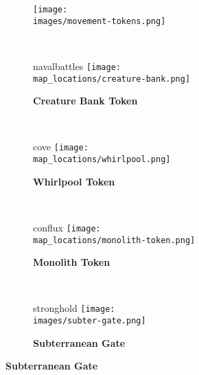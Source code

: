 \begin{figure}[H]
  \centering
  \begin{subfigure}[c]{0.15\linewidth}
    \centering
    \texttt{[image: \\images/movement-tokens.png]}
    \caption{\textbf{}}
  \end{subfigure}
  ~
  \begin{subfigure}[c]{0.15\linewidth}
    \begin{expansionmini}{navalbattles}
      \vspace{3mm}
      \centering
      \texttt{[image: \\map\_locations/creature-bank.png]}
      \caption{\textbf{Creature Bank Token}}
    \end{expansionmini}
  \end{subfigure}
  ~
  \begin{subfigure}[c]{0.12\linewidth}
    \begin{expansionmini}{cove}
      \vspace{3mm}
      \centering
      \texttt{[image: \\map\_locations/whirlpool.png]}
      \caption{\textbf{Whirlpool Token \phantom{Population}}}
    \end{expansionmini}
  \end{subfigure}
  ~
  \begin{subfigure}[c]{0.12\linewidth}
    \begin{expansionmini}{conflux}
      \vspace{3mm}
      \centering
      \texttt{[image: \\map\_locations/monolith-token.png]}
      \caption{\textbf{Monolith Token \phantom{Population}}}
    \end{expansionmini}
  \end{subfigure}
  ~
  \begin{subfigure}[c]{0.14\linewidth}
    \begin{expansionmini}{stronghold}
      \centering
      \texttt{[image: \\images/subter-gate.png]}
      \vspace*{-1em}
      \caption{\textbf{Subterranean Gate}}
    \end{expansionmini}
  \end{subfigure}
\end{figure}

